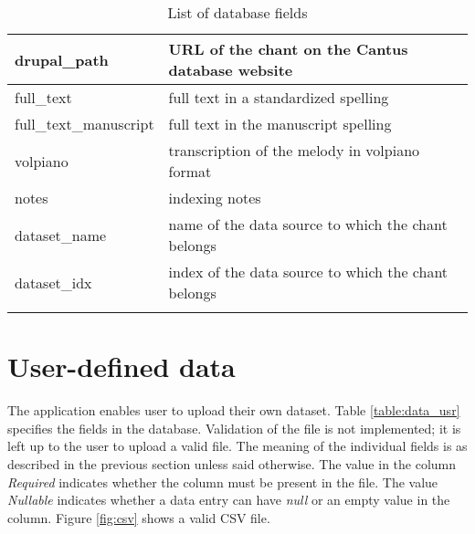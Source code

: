 \begin{longtable}{| p{} | p{} |}
 drupal\_path   & URL of the chant on the Cantus database website \\ \hline
 full\_text     & full text in a standardized spelling \\ \hline
 full\_text\_manuscript & full text in the manuscript spelling \\ \hline
 volpiano       & transcription of the melody in volpiano format \\ \hline
 notes          & indexing notes \\ \hline
 dataset\_name  & name of the data source to which the chant belongs \\ \hline
 dataset\_idx   & index of the data source to which the chant belongs \\
 \hline

\caption{List of database fields}
\label{table:data_db}
\end{longtable}

\section{User-defined data}
\label{section:data_usr}

The application enables user to upload their own dataset. Table \ref{table:data_usr} specifies the fields in the database. Validation of the
file is not implemented; it is left up to the user to upload a valid file. The meaning of the individual
fields is as described in the previous section unless said otherwise. The value in the column \emph{Required} indicates whether
the column must be present in the file. The value \emph{Nullable} indicates whether a data entry can have \emph{null} or an empty value in the column.
Figure \ref{fig:csv} shows a valid CSV file.

